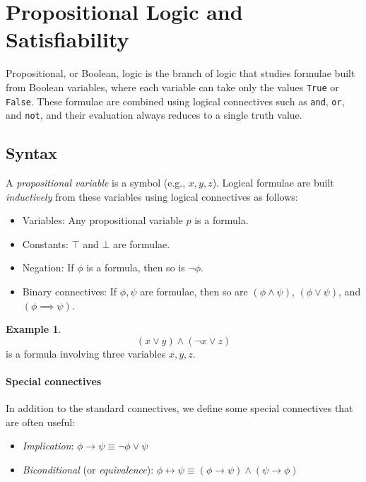 \documentclass[oneside,11pt,dvipsnames]{book}
\numberwithin{equation}{section}
\theoremstyle{definition}
\newtheorem{example}{Example}[section]
\theoremstyle{remark}
\begin{document}
\section{Propositional Logic and Satisfiability}\label{sec:propositional-logic}

Propositional, or Boolean, logic is the branch of logic that studies formulae built from Boolean variables, where each variable can take only the values \texttt{True} or \texttt{False}. These formulae are combined using logical connectives such as \texttt{and}, \texttt{or}, and \texttt{not}, and their evaluation always reduces to a single truth value.

\subsection{Syntax}\label{sec:syntax}

A \emph{propositional variable} is a symbol (e.g., $x, y, z$). Logical formulae are built \emph{inductively} from these variables using logical connectives as follows:

\begin{itemize}
  \item Variables: Any propositional variable $p$ is a formula.
  \item Constants: $\top$ and $\bot$ are formulae.
  \item Negation: If $\phi$ is a formula, then so is $\lnot{\phi}$.
  \item Binary connectives: If $\phi, \psi$ are formulae, then so are
    $(\phi \land \psi)$, $(\phi \lor \psi)$, and $(\phi \implies \psi)$.
\end{itemize}

\begin{example}

\[
(x \lor y) \land (\lnot x \lor z)
\]
is a formula involving three variables $x,y,z$.
\end{example}

\paragraph{Special connectives} In addition to the standard connectives, we define some special connectives that are often useful:

\begin{itemize}
    \item \emph{Implication}: $\phi \to \psi \equiv \lnot{\phi} \lor \psi$
    \item \emph{Biconditional} (or \emph{equivalence}): $\phi \leftrightarrow \psi \equiv (\phi \to \psi) \land (\psi \to \phi)$
\end{itemize}
\end{document}
